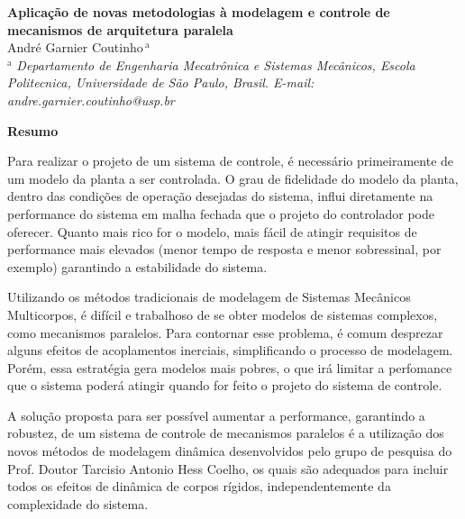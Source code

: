 \documentclass[a4paper,11pt,brazil,fleqn]{article}
\begin{document}

\setcounter{MaxMatrixCols}{50}

\noindent
{\bf \huge Aplica\c{c}\~ao de novas metodologias \`a modelagem e controle de mecanismos de arquitetura paralela}\\

\noindent
{\Large 		Andr\'e Garnier Coutinho$\,{}^\text{a}$
}\\

\noindent
{${}^\text{a}$ \it Departamento de Engenharia Mecatr\^onica e Sistemas Mec\^anicos, Escola Politecnica, 
Universidade de S\~ao Paulo, Brasil. E-mail: andre.garnier.coutinho@usp.br}

\vspace{24pt}
%

\begin{center}
\textbf{Resumo}
\end{center}

Para realizar o projeto de um sistema de controle, \'e necess\'ario primeiramente de um modelo da planta a ser controlada. O grau de fidelidade do modelo da planta, dentro das condi\c{c}\~oes de opera\c{c}\~ao desejadas do sistema, influi diretamente na performance do sistema em malha fechada que o projeto do controlador pode oferecer. Quanto mais rico for o modelo, mais f\'acil de atingir requisitos de performance mais elevados (menor tempo de resposta e menor sobressinal, por exemplo) garantindo a estabilidade do sistema.

Utilizando os m\'etodos tradicionais de modelagem de Sistemas Mec\^anicos Multicorpos, \'e dif\'icil e trabalhoso de se obter modelos de sistemas complexos, como mecanismos paralelos. Para contornar esse problema, \'e comum desprezar alguns efeitos de acoplamentos inerciais, simplificando o processo de modelagem. Por\'em, essa estrat\'egia gera modelos mais pobres, o que ir\'a limitar a perfomance que o sistema poder\'a atingir quando for feito o projeto do sistema de controle.

A solu\c{c}\~ao proposta para ser poss\'ivel aumentar a performance, garantindo a robustez, de um sistema de controle de mecanismos paralelos \'e a utiliza\c{c}\~ao dos novos m\'etodos de modelagem din\^amica desenvolvidos pelo grupo de pesquisa do Prof. Doutor Tarcisio Antonio Hess Coelho, os quais s\~ao adequados para incluir todos os efeitos de din\^amica de corpos r\'igidos, independentemente da complexidade do sistema.
\end{document}

